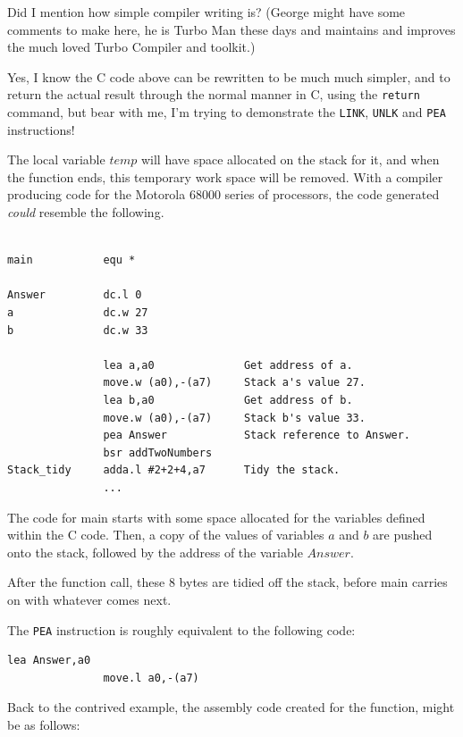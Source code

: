 Did I mention how simple compiler writing is? (George might have some comments to make here, he is Turbo Man these days and maintains and improves the much loved Turbo Compiler and toolkit.)

Yes, I know the C code above can be rewritten to be much much simpler, and to return the actual result through the normal manner in C, using the \texttt{return} command, but bear with me, I'm trying to demonstrate the \texttt{LINK}, \texttt{UNLK} and \texttt{PEA} instructions! 

The local variable $temp$ will have space allocated on the stack for it, and when the function ends, this temporary work space will be removed. With a compiler producing code for the Motorola 68000 series of processors, the code generated \emph{could} resemble the following.

\begin{lstlisting}[firstnumber=1,caption={Contrived Assembly Code}]

main           equ *

Answer         dc.l 0
a              dc.w 27
b              dc.w 33

               lea a,a0              Get address of a.
               move.w (a0),-(a7)     Stack a's value 27.
               lea b,a0              Get address of b.
               move.w (a0),-(a7)     Stack b's value 33.
               pea Answer            Stack reference to Answer.
               bsr addTwoNumbers
Stack_tidy     adda.l #2+2+4,a7      Tidy the stack.
               ...               
\end{lstlisting}

The code for main starts with some space allocated for the variables defined within the C code. Then, a copy of the values of variables $a$ and $b$ are pushed onto the stack, followed by the address of the variable $Answer$.

After the function call, these 8 bytes are tidied off the stack, before main carries on with whatever comes next.

The \texttt{PEA} instruction is roughly equivalent to the following code:

\begin{lstlisting}[caption={PEA Equivalent Code}]
               lea Answer,a0
               move.l a0,-(a7)
\end{lstlisting}

Back to the contrived example, the assembly code created for the function, might be as follows:

